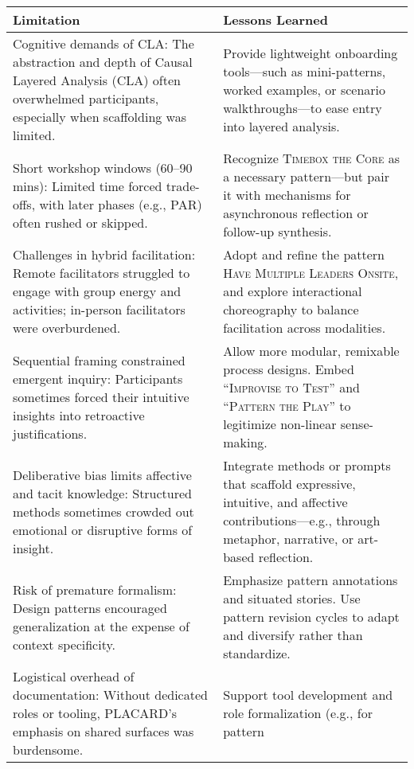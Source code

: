 \documentclass[acmlarge,timestamp]{acmart}
\begin{document}
{\begin{longtable}[]{@{}p{}p{}@{}}
\toprule\noalign{}
\endhead
\bottomrule\noalign{}
\endlastfoot
{Limitation} & {Lessons Learned} \\ \hline
{Cognitive demands of CLA}{: The abstraction and depth of Causal
  Layered Analysis (CLA) often overwhelmed participants, especially
  when scaffolding was limited.}
& {Provide lightweight onboarding tools---such as mini-patterns,
    worked examples, or scenario walkthroughs---to ease entry into
    layered analysis.} \\ \hline
{Short workshop windows (60--90 mins)}{: Limited time forced
  trade-offs, with later phases (e.g., PAR) often rushed or skipped.}
& {Recognize {\scshape{Timebox the Core}} as a necessary pattern---but
    pair it with mechanisms for asynchronous reflection or follow-up
    synthesis.} \\ \hline
{Challenges in hybrid facilitation}{: Remote facilitators struggled to
  engage with group energy and activities; in-person facilitators were
  overburdened.}
& {Adopt and refine the pattern } {\scshape{Have Multiple Leaders
    Onsite}}{, and explore interactional choreography to balance
  facilitation across modalities.} \\ \hline
{Sequential framing constrained emergent inquiry}{: Participants
  sometimes forced their intuitive insights into retroactive
  justifications.}
& {Allow more modular, remixable process designs. Embed
    ``{\scshape{Improvise to Test}}'' and ``{\scshape{Pattern the
        Play}}'' to legitimize non-linear sense-making.} \\ \hline
{Deliberative bias limits affective and tacit knowledge}{: Structured
  methods sometimes crowded out emotional or disruptive forms of
  insight.}
& {Integrate methods or prompts that scaffold expressive, intuitive,
    and affective contributions---e.g., through metaphor, narrative,
    or art-based reflection.} \\ \hline
{Risk of premature formalism}{: Design patterns encouraged
  generalization at the expense of context specificity.}
& {Emphasize pattern annotations and situated stories. Use pattern
    revision cycles to adapt and diversify rather than standardize.}
\\ \hline
{Logistical overhead of documentation}{: Without dedicated roles or
  tooling, PLACARD's emphasis on shared surfaces was burdensome.}
& {Support tool development and role formalization (e.g., for pattern
}
\end{longtable}}
\end{document}
